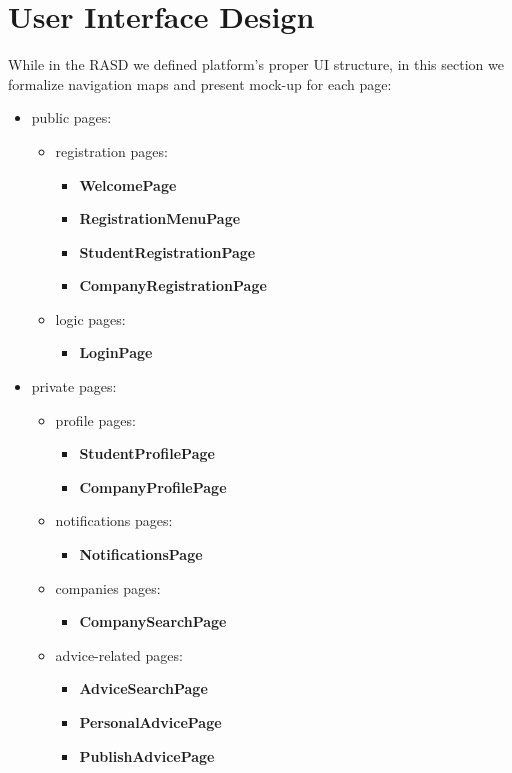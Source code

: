 \chapter{User Interface Design}
	While in the RASD we defined platform's proper UI structure, in this section we formalize navigation maps and present mock-up for each page:
	\begin{itemize}
		\item public pages:
		\begin{itemize}
			\item registration pages:
			\begin{itemize}
				\item \textbf{WelcomePage}
				\item \textbf{RegistrationMenuPage}
				\item \textbf{StudentRegistrationPage}
				\item \textbf{CompanyRegistrationPage}
			\end{itemize}
			\item logic pages:
			\begin{itemize}
				\item \textbf{LoginPage}
			\end{itemize}
		\end{itemize}
		\item private pages:
		\begin{itemize}
			\item profile pages:
			\begin{itemize}
				\item \textbf{StudentProfilePage}
				\item \textbf{CompanyProfilePage}
			\end{itemize}
			\item notifications pages:
			\begin{itemize}
				\item \textbf{NotificationsPage}
			\end{itemize}
			\item companies pages:
			\begin{itemize}
				\item \textbf{CompanySearchPage}
			\end{itemize}
			\item advice-related pages:
			\begin{itemize}
				\item \textbf{AdviceSearchPage}
				\item \textbf{PersonalAdvicePage}
				\item \textbf{PublishAdvicePage}

\end{itemize}
\end{itemize}
\end{itemize}
